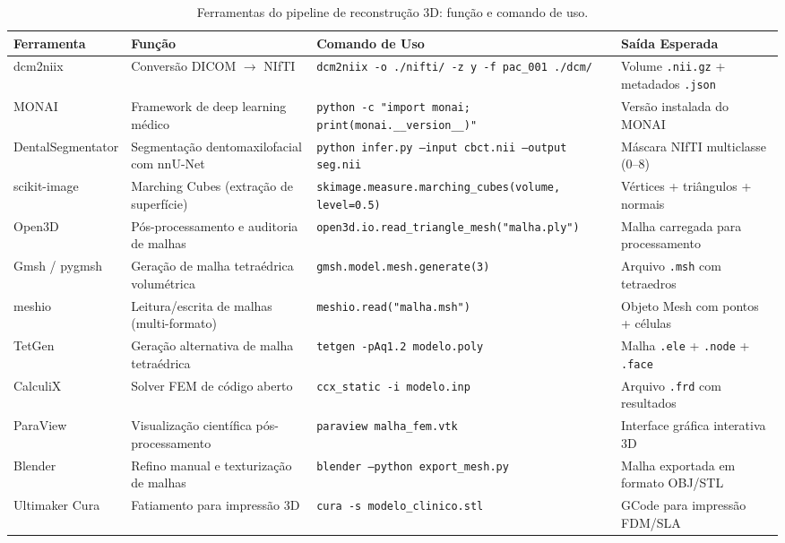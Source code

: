 \begin{table}[htbp]
\centering
\caption{Ferramentas do pipeline de reconstrução 3D: função e comando de uso.}
\label{tab:ferramentas}
\begin{adjustbox}{max width=\textwidth}
\begin{tabular}{llp{4cm}p{5cm}}
\toprule
\textbf{Ferramenta} & \textbf{Função} & \textbf{Comando de Uso} & \textbf{Saída Esperada} \\
\midrule
dcm2niix & Conversão DICOM $\rightarrow$ NIfTI &
\texttt{dcm2niix -o ./nifti/ -z y -f pac\_001 ./dcm/} &
Volume \texttt{.nii.gz} + metadados \texttt{.json} \\
\midrule
MONAI & Framework de deep learning médico &
\texttt{python -c "import monai; print(monai.\_\_version\_\_)"} &
Versão instalada do MONAI \\
\midrule
DentalSegmentator & Segmentação dentomaxilofacial com nnU-Net &
\texttt{python infer.py --input cbct.nii --output seg.nii} &
Máscara NIfTI multiclasse (0--8) \\
\midrule
scikit-image & Marching Cubes (extração de superfície) &
\texttt{skimage.measure.marching\_cubes(volume, level=0.5)} &
Vértices + triângulos + normais \\
\midrule
Open3D & Pós-processamento e auditoria de malhas &
\texttt{open3d.io.read\_triangle\_mesh("malha.ply")} &
Malha carregada para processamento \\
\midrule
Gmsh / pygmsh & Geração de malha tetraédrica volumétrica &
\texttt{gmsh.model.mesh.generate(3)} &
Arquivo \texttt{.msh} com tetraedros \\
\midrule
meshio & Leitura/escrita de malhas (multi-formato) &
\texttt{meshio.read("malha.msh")} &
Objeto Mesh com pontos + células \\
\midrule
TetGen & Geração alternativa de malha tetraédrica &
\texttt{tetgen -pAq1.2 modelo.poly} &
Malha \texttt{.ele} + \texttt{.node} + \texttt{.face} \\
\midrule
CalculiX & Solver FEM de código aberto &
\texttt{ccx\_static -i modelo.inp} &
Arquivo \texttt{.frd} com resultados \\
\midrule
ParaView & Visualização científica pós-processamento &
\texttt{paraview malha\_fem.vtk} &
Interface gráfica interativa 3D \\
\midrule
Blender & Refino manual e texturização de malhas &
\texttt{blender --python export\_mesh.py} &
Malha exportada em formato OBJ/STL \\
\midrule
Ultimaker Cura & Fatiamento para impressão 3D &
\texttt{cura -s modelo\_clinico.stl} &
GCode para impressão FDM/SLA \\
\bottomrule
\end{tabular}
\end{adjustbox}
\end{table}

